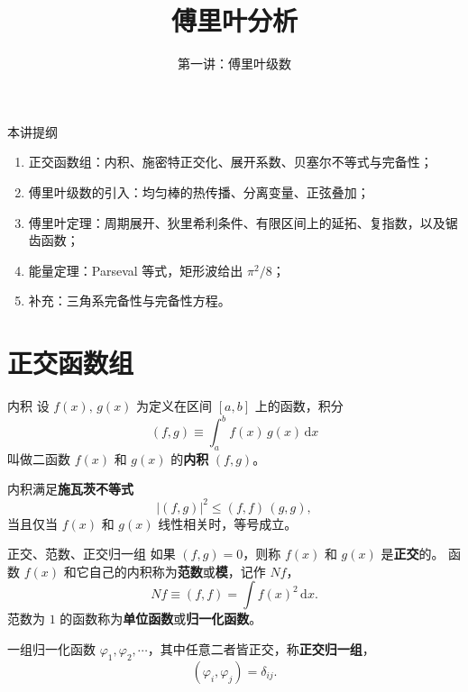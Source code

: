 \documentclass[fontset=windows, chinese, 10pt, xcolor=dvipsnames]{beamer}
\title{傅里叶分析}
\subtitle{第一讲：傅里叶级数}
\begin{document}
\begin{frame}
  \titlepage
\end{frame}

\begin{frame}{本讲提纲}
  \begin{enumerate}
    \item 正交函数组：内积、施密特正交化、展开系数、贝塞尔不等式与完备性；
    \item 傅里叶级数的引入：均匀棒的热传播、分离变量、正弦叠加；
    \item 傅里叶定理：周期展开、狄里希利条件、有限区间上的延拓、复指数，以及锯齿函数；
    \item 能量定理：Parseval 等式，矩形波给出 $\pi^2/8$；
    \item 补充：三角系完备性与完备性方程。
  \end{enumerate}
\end{frame}

\section{正交函数组}

\begin{frame}{内积}
  设 $f(x),\,g(x)$ 为定义在区间 $[a,b]$ 上的函数，积分
  \begin{equation*}
    (f,g)\equiv\int_a^b f(x)\,g(x)\,\mathrm{d}x
  \end{equation*}
  叫做二函数 $f(x)$ 和 $g(x)$ 的\textbf{内积} $(f,g)$。
  \vspace{0.5em}

  内积满足\textbf{施瓦茨不等式}
  \begin{equation*}
    |(f,g)|^2\leq (f,f)\,(g,g),
  \end{equation*}
  当且仅当 $f(x)$ 和 $g(x)$ 线性相关时，等号成立。
\end{frame}

\begin{frame}{正交、范数、正交归一组}
  如果 $(f,g)=0$，则称 $f(x)$ 和 $g(x)$ 是\textbf{正交}的。
  函数 $f(x)$ 和它自己的内积称为\textbf{范数}或\textbf{模}，记作 $Nf$，
  \begin{equation*}
    Nf\equiv(f,f)=\int f(x)^2\,\mathrm{d}x.
  \end{equation*}
  范数为 $1$ 的函数称为\textbf{单位函数}或\textbf{归一化函数}。
  \vspace{0.4em}

  一组归一化函数 $\varphi_1,\varphi_2,\cdots$，其中任意二者皆正交，称\textbf{正交归一组}，
  \begin{equation*}
    (\varphi_i,\varphi_j)=\delta_{ij}.
  \end{equation*}
\end{frame}
\end{document}
